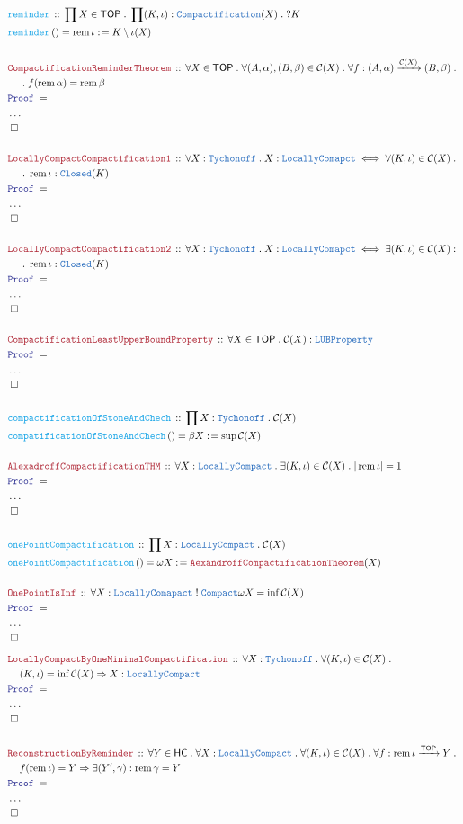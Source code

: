 \documentclass[12pt]{scrartcl}
\newcommand{\TYPE}[1]{\textcolor{NavyBlue}{\mathtt{#1}}}
\newcommand{\FUNC}[1]{\textcolor{Cerulean}{\mathtt{#1}}}
\newcommand{\LOGIC}[1]{\textcolor{Blue}{\mathtt{#1}}}
\newcommand{\THM}[1]{\textcolor{Maroon}{\mathtt{#1}}}
\renewcommand{\.}{\; . \;}
\newcommand{\de}{: \kern 0.1pc =}
\newcommand{\IsNot}{\; ! \;}
\newcommand{\Act}[1]{\left( #1 \right)}
\newcommand{\Theorem}[2]{& \THM{#1} \, :: \, #2 \\ & \Proof = \\ }
\newcommand{\DeclareFunc}[2]{& \FUNC{#1} \, :: \, #2 \\}
\newcommand{\DefineNamedFunc}[4]{&  \FUNC{#1}\Act{#2} = #3 \de #4 \\}
\newcommand{\NewLine}{\\ & \kern 1pc}
\newcommand{\Page}[1]{ \begin{align*} #1 \end{align*}   }
\newcommand{\NoProof}{ & \ldots \\ \EndProof}
\newcommand{\Imply}{\Rightarrow}
\newcommand{\Arrow}{\xrightarrow}
\newcommand{\QED}{\; \square}
\newcommand{\EndProof}{& \QED \\}
\newcommand{\Proof}{\LOGIC{Proof} \; }
\renewcommand{\C}{\mathcal{C}}
\DeclareMathOperator{\rem}{rem}
\newcommand{\TOP}{\mathsf{TOP}}
\newcommand{\HC}{\mathsf{HC}}
\begin{document}
\Page{
	\DeclareFunc{reminder}{ \prod X \in \TOP \. \prod (K,\iota) : \TYPE{Compactification}(X) \. ?K  }
	\DefineNamedFunc{reminder}{}{\rem \iota}{K \setminus  \iota(X)}
	\\
	\Theorem{CompactificationReminderTheorem}
	{
		\forall X \in \TOP \. 
		\forall (A,\alpha),(B,\beta) \in \C(X) \.
		\forall f : (A,\alpha) \Arrow{\C(X)} (B,\beta) \. \NewLine \. 
		f(\rem \alpha) = \rem \beta
	}
	\NoProof
	\\
	\Theorem{LocallyCompactCompactification1}
	{
		\forall X : \TYPE{Tychonoff} \.
		X : \TYPE{LocallyComapct} \iff
		\forall (K, \iota) \in \C(X) \.
		\NewLine \.
		\rem \iota : \TYPE{Closed}(K)
	}
	\NoProof
	\\
	\Theorem{LocallyCompactCompactification2}
	{
		\forall X : \TYPE{Tychonoff} \.
		X : \TYPE{LocallyComapct} \iff
		\exists (K, \iota) \in \C(X) :
		\NewLine \.
		\rem \iota : \TYPE{Closed}(K)
	}
	\NoProof
	\\
	\Theorem{CompactificationLeastUpperBoundProperty}
	{
		\forall X \in \TOP \. \C(X) : \TYPE{LUBProperty}
	}
	\NoProof
	\\
	\DeclareFunc{compactificationOfStoneAndChech}
	{
		\prod  X : \TYPE{Tychonoff}  \. \C(X)
	}
	\DefineNamedFunc{compatificationOfStoneAndChech}{}{\beta X}{\sup \C(X)}
	\\
	\Theorem{AlexadroffCompactificationTHM}
	{
		\forall X : \TYPE{LocallyCompact} \.
		\exists (K, \iota) \in \C(X) \. 
		| \rem \iota | = 1
	}
	\NoProof
	\\
	\DeclareFunc{onePointCompactification}
	{
		\prod  X : \TYPE{LocallyCompact}  \. \C(X)
	}
	\DefineNamedFunc{onePointCompactification}{}{\omega X}{\THM{AexandroffCompactificationTheorem}(X)}
	\\
	\Theorem{OnePointIsInf}
	{
		\forall X : \TYPE{LocallyComapact} \IsNot \TYPE{Compact} \/
		\omega X = \inf \C(X)
	}
	\NoProof
}
\Page{
	\Theorem{LocallyCompactByOneMinimalCompactification}
	{
		\forall X : \TYPE{Tychonoff} \.
		\forall (K,\iota) \in \C(X) \. \NewLine 
		(K,\iota) = \inf \C(X) \Imply X : \TYPE{LocallyCompact}
	}
	\NoProof
	\\
	\Theorem{ReconstructionByReminder}
	{
		\forall Y \in \HC \.
		\forall X : \TYPE{LocallyCompact} \.
		\forall (K,\iota) \in \C(X) \.
		\forall f : \rem \iota \Arrow{\TOP} Y \. \NewLine  
		f(\rem \iota) = Y \Imply \exists (Y', \gamma ) : 
		\rem \gamma = Y
	}
	\NoProof
}
\newpage
\end{document}
